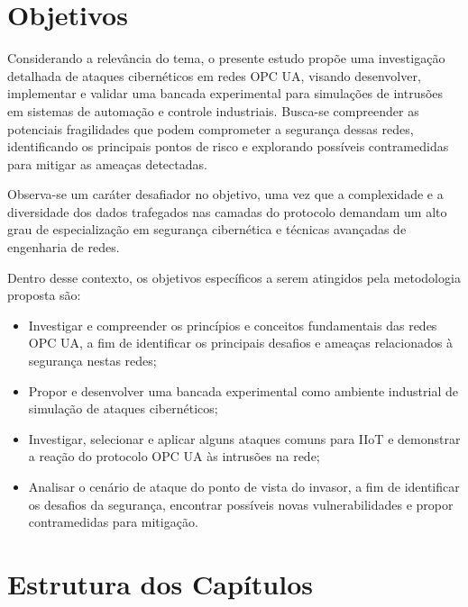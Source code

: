     \section{Objetivos} \label{sec:objetivos}

    Considerando a relevância do tema, o presente estudo propõe uma investigação detalhada de ataques cibernéticos em redes OPC UA, visando desenvolver, implementar e validar uma bancada experimental para simulações de intrusões em sistemas de automação e controle industriais. Busca-se compreender as potenciais fragilidades que podem comprometer a segurança dessas redes, identificando os principais pontos de risco e explorando possíveis contramedidas para mitigar as ameaças detectadas.

    Observa-se um caráter desafiador no objetivo, uma vez que a complexidade e a diversidade dos dados trafegados nas camadas do protocolo demandam um alto grau de especialização em segurança cibernética e técnicas avançadas de engenharia de redes.

    Dentro desse contexto, os objetivos específicos a serem atingidos pela metodologia proposta são:
    
    \begin{itemize}
        \item Investigar e compreender os princípios e conceitos fundamentais das redes OPC UA, a fim de identificar os principais desafios e ameaças relacionados à segurança nestas redes;
        \item Propor e desenvolver uma bancada experimental como ambiente industrial de simulação de ataques cibernéticos;
        \item Investigar, selecionar e aplicar alguns ataques comuns para IIoT e demonstrar a reação do protocolo OPC UA às intrusões na rede;
        \item Analisar o cenário de ataque do ponto de vista do invasor, a fim de identificar os desafios da segurança, encontrar possíveis novas vulnerabilidades e propor contramedidas para mitigação.
    \end{itemize}
    
    \section{Estrutura dos Capítulos} \label{sec:estCapitulos}

